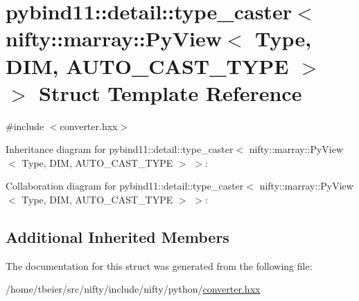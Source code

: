 \hypertarget{structpybind11_1_1detail_1_1type__caster_3_01nifty_1_1marray_1_1PyView_3_01Type_00_01DIM_00_01AUTO__CAST__TYPE_01_4_01_4}{}\section{pybind11\+:\+:detail\+:\+:type\+\_\+caster$<$ nifty\+:\+:marray\+:\+:Py\+View$<$ Type, D\+I\+M, A\+U\+T\+O\+\_\+\+C\+A\+S\+T\+\_\+\+T\+Y\+P\+E $>$ $>$ Struct Template Reference}
\label{structpybind11_1_1detail_1_1type__caster_3_01nifty_1_1marray_1_1PyView_3_01Type_00_01DIM_00_01AUTO__CAST__TYPE_01_4_01_4}


{\ttfamily \#include $<$converter.\+hxx$>$}



Inheritance diagram for pybind11\+:\+:detail\+:\+:type\+\_\+caster$<$ nifty\+:\+:marray\+:\+:Py\+View$<$ Type, D\+I\+M, A\+U\+T\+O\+\_\+\+C\+A\+S\+T\+\_\+\+T\+Y\+P\+E $>$ $>$\+:


Collaboration diagram for pybind11\+:\+:detail\+:\+:type\+\_\+caster$<$ nifty\+:\+:marray\+:\+:Py\+View$<$ Type, D\+I\+M, A\+U\+T\+O\+\_\+\+C\+A\+S\+T\+\_\+\+T\+Y\+P\+E $>$ $>$\+:
\subsection*{Additional Inherited Members}


The documentation for this struct was generated from the following file\+:\begin{DoxyCompactItemize}
\item 
/home/tbeier/src/nifty/include/nifty/python/\hyperlink{converter_8hxx}{converter.\+hxx}\end{DoxyCompactItemize}
